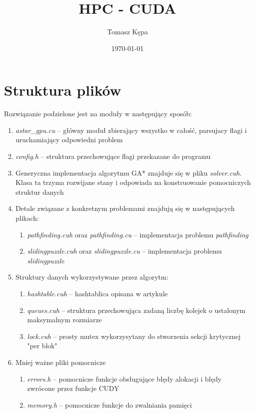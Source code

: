 \documentclass{article}
\date\today
\title{HPC - CUDA}
\author{Tomasz Kępa}
\begin{document}
\maketitle


\section{Struktura plików}
Rozwiązanie podzielone jest na moduły w następujący sposób:
\begin{enumerate}
  \item \emph{astar\_gpu.cu} -- główny moduł zbierający wszystko w całość, parsujacy flagi i uruchamiający odpowiedni problem
  \item \emph{config.h} -- struktura przechowujące flagi przekazane do programu
  \item Generyczna implementacja algorytmu GA* znajduje się w pliku \emph{solver.cuh}. 
  			Klasa ta trzyma rozwijane stany i odpowiada na konstruowanie pomocniczych struktur danych
  \item Detale związane z konkretnym problemami znajdują się w następujących plikach:
    \begin{enumerate}
      \item \emph{pathfinding.cuh} oraz \emph{pathfinding.cu} -- implementacja problemu \emph{pathfinding}
      \item \emph{slidingpuzzle.cuh} oraz \emph{slidingpuzzle.cu} -- implementacja problemu \emph{slidingpuzzle}
    \end{enumerate}
  \item Struktury danych wykorzystywane przez algorytm:
    \begin{enumerate}
      \item \emph{hashtable.cuh} -- hashtablica opisana w artykule
      \item \emph{queues.cuh} -- struktura przechowująca zadaną liczbę kolejek o ustalonym maksymalnym rozmiarze
      \item \emph{lock.cuh} -- prosty mutex wykorzysytany do stworzenia sekcji krytycznej "per blok"
    \end{enumerate}
  \item Mniej ważne pliki pomocnicze
    \begin{enumerate}
      \item \emph{errors.h} -- pomocnicze funkcje obsługujące błędy alokacji i błędy zwrócone przez funkcje CUDY
      \item \emph{memory.h} -- pomocnicze funkcje do zwalniania pamięci
    \end{enumerate}
\end{enumerate}
\end{document}
